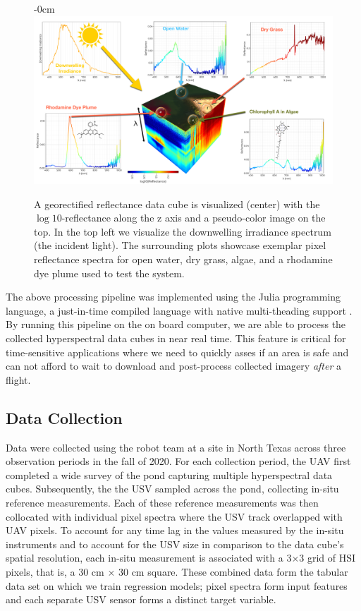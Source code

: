 \documentclass[sensors,article,submit,pdftex,moreauthors]{Definitions/mdpi}
\begin{document}
\begin{figure}[H]
\begin{adjustwidth}{-\extralength}{0cm}
\centering
\includegraphics[width=15.5cm]{paper/figures/materials-and-methods/HyperSpectralInfoGraphic.pdf}
\end{adjustwidth}
\caption{A georectified reflectance data cube is visualized (center) with the $\log10$-reflectance along the z axis and a pseudo-color image on the top. In the top left we visualize the downwelling irradiance spectrum (the incident light). The surrounding plots showcase exemplar pixel reflectance spectra for open water, dry grass, algae, and a rhodamine dye plume used to test the system.\label{fig:hsi-infographic}}
\end{figure}  

The above processing pipeline was implemented using the Julia programming language, a just-in-time compiled language with native multi-theading support \cite{julia-1}. By running this pipeline on the on board computer, we are able to process the collected hyperspectral data cubes in near real time. This feature is critical for time-sensitive applications where we need to quickly asses if an area is safe and can not afford to wait to download and post-process collected imagery \textit{after} a flight.

\subsection{Data Collection}

Data were collected using the robot team at a site in North Texas across three observation periods in the fall of 2020. For each collection period, the UAV first completed a wide survey of the pond capturing multiple hyperspectral data cubes. Subsequently, the the USV sampled across the pond, collecting in-situ reference measurements. Each of these reference measurements was then collocated with individual pixel spectra where the USV track overlapped with UAV pixels. To account for any time lag in the values measured by the in-situ instruments and to account for the USV size in comparison to the data cube's spatial resolution, each in-situ measurement is associated with a 3$\times$3 grid of HSI pixels, that is, a 30 cm $\times$ 30 cm square. These combined data form the tabular data set on which we train regression models; pixel spectra form input features and each separate USV sensor forms a distinct target variable. 
\end{document}
